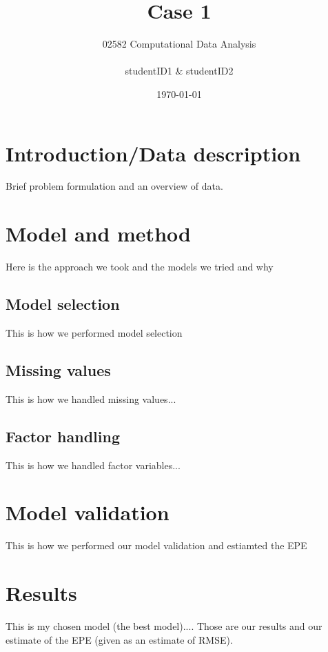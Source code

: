 \documentclass{article}
\title{Case 1}
\author{02582 Computational Data Analysis \\ \\ studentID1 \& studentID2}
\date{\today}
\begin{document}
\maketitle
\section*{Introduction/Data description}
Brief problem formulation and an overview of data.
\section*{Model and method}
Here is the approach we took and the models we tried and why

\subsection*{Model selection}
This is how we performed model selection
\subsection*{Missing values}
This is how we handled missing values...
\subsection*{Factor handling}
This is how we handled factor variables...

\section*{Model validation}
This is how we performed our model validation and estiamted the EPE

\section*{Results}
This is my chosen model (the best model)....
Those are our results and our estimate of the EPE (given as
an estimate of RMSE).
\end{document}
